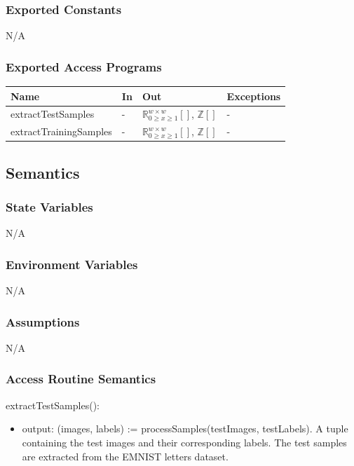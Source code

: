 \documentclass[12pt, titlepage]{article}
\begin{document}
\subsubsection{Exported Constants}

N/A

\subsubsection{Exported Access Programs}


\begin{center}
\begin{tabular}{p{5cm} p{2cm} p{4cm} p{2cm}}
\hline
\textbf{Name} & \textbf{In} & \textbf{Out} & \textbf{Exceptions} \\
\hline
extractTestSamples & - & ${\mathbb{R}^{w \times w}_{0 \ge x \ge 1}[]}$, ${\mathbb{Z}[]}$ & - \\
extractTrainingSamples & - & ${\mathbb{R}^{w \times w}_{0 \ge x \ge 1}[]}$, ${\mathbb{Z}[]}$ & - \\
\hline
\end{tabular}
\end{center}

\subsection{Semantics}

\subsubsection{State Variables}

N/A

\subsubsection{Environment Variables}

N/A

\subsubsection{Assumptions}

N/A

\subsubsection{Access Routine Semantics}

\noindent extractTestSamples():
\begin{itemize}
\item output: (images, labels) := processSamples(testImages, testLabels). A
tuple containing the test images and their corresponding labels. The test
samples are extracted from the EMNIST letters dataset.
\end{itemize}
\end{document}
